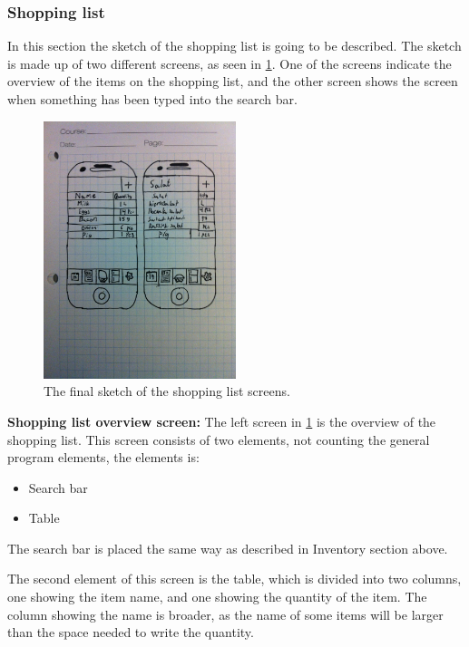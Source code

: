\subsubsection{Shopping list} \label{ShoppingListSketches}
In this section the sketch of the shopping list is going to be described. The sketch is made up of two different screens, as seen in \cref{FinalShoppingListSketch}. One of the screens indicate the overview of the items on the shopping list, and the other screen shows the screen when something has been typed into the search bar.

\begin{figure}[H]
    \centering
    \includegraphics[width=0.5\textwidth]{Grafik/FoodPlanner/FinalShoppingListSketch}
    \caption{The final sketch of the shopping list screens.}
    \label{FinalShoppingListSketch}
\end{figure}

\textbf{Shopping list overview screen:} The left screen in \cref{FinalShoppingListSketch} is the overview of the shopping list. This screen consists of two elements, not counting the general program elements, the elements is:

\begin{itemize}
	\item Search bar
	\item Table
\end{itemize}

The search bar is placed the same way as described in Inventory section above.

The second element of this screen is the table, which is divided into two columns, one showing the item name, and one showing the quantity of the item. The column showing the name is broader, as the name of some items will be larger than the space needed to write the quantity.

